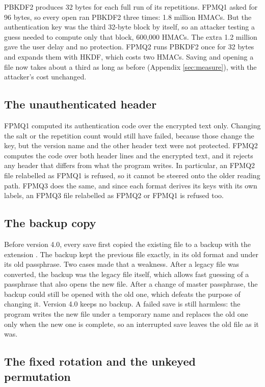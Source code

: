PBKDF2 produces 32 bytes for each full run of its repetitions. FPMQ1 asked for
96 bytes, so every open ran PBKDF2 three times: 1.8 million HMACs. But the
authentication key was the third 32-byte block by itself, so an attacker
testing a guess needed to compute only that block, 600,000 HMACs. The extra 1.2
million gave the user delay and no protection. FPMQ2 runs PBKDF2 once for 32
bytes and expands them with HKDF, which costs two HMACs. Saving and opening a
file now takes about a third as long as before (Appendix \ref{sec:measure}),
with the attacker's cost unchanged.

\subsection{The unauthenticated header}

FPMQ1 computed its authentication code over the encrypted text only. Changing
the salt or the repetition count would still have failed, because those change
the key, but the version name and the other header text were not protected.
FPMQ2 computes the code over both header lines and the encrypted text, and it
rejects any header that differs from what the program writes. In particular, an
FPMQ2 file relabelled as FPMQ1 is refused, so it cannot be steered onto the
older reading path. FPMQ3 does the same, and since each format derives its keys
with its own labels, an FPMQ3 file relabelled as FPMQ2 or FPMQ1 is refused too.

\subsection{The backup copy}

Before version 4.0, every save first copied the existing file to a backup with
the extension . The backup kept the previous file exactly, in its old
format and under its old passphrase. Two cases made that a weakness. After a
legacy file was converted, the backup was the legacy file itself, which allows
fast guessing of a passphrase that also opens the new file. After a change of
master passphrase, the backup could still be opened with the old one, which
defeats the purpose of changing it. Version 4.0 keeps no backup. A failed save
is still harmless: the program writes the new file under a temporary name and
replaces the old one only when the new one is complete, so an interrupted save
leaves the old file as it was.

\subsection{The fixed rotation and the unkeyed permutation}
\label{sec:v2}

